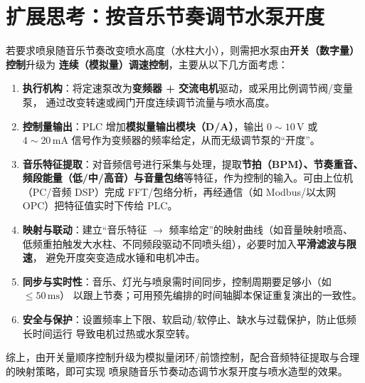 \documentclass[12pt,a4paper]{ctexart}
\begin{document}
\section{扩展思考：按音乐节奏调节水泵开度}
若要求喷泉随音乐节奏改变喷水高度（水柱大小），则需把水泵由\textbf{开关（数字量）控制}升级为
\textbf{连续（模拟量）调速控制}，主要从以下几方面考虑：
\begin{enumerate}
  \item \textbf{执行机构}：将定速泵改为\textbf{变频器 + 交流电机}驱动，或采用比例调节阀/变量泵，
        通过改变转速或阀门开度连续调节流量与喷水高度。
  \item \textbf{控制量输出}：PLC 增加\textbf{模拟量输出模块（D/A）}，输出 $0\!\sim\!10\,\mathrm{V}$ 或
        $4\!\sim\!20\,\mathrm{mA}$ 信号作为变频器的频率给定，从而无级调节泵的“开度”。
  \item \textbf{音乐特征提取}：对音频信号进行采集与处理，提取\textbf{节拍（BPM）、节奏重音、
        频段能量（低/中/高音）与音量包络}等特征，作为控制的输入。可由上位机（PC/音频 DSP）完成
        FFT/包络分析，再经通信（如 Modbus/以太网 OPC）把特征值实时下传给 PLC。
  \item \textbf{映射与联动}：建立“音乐特征 $\rightarrow$ 频率给定”的映射曲线（如音量映射喷高、
        低频重拍触发大水柱、不同频段驱动不同喷头组），必要时加入\textbf{平滑滤波与限速}，
        避免开度突变造成水锤和电机冲击。
  \item \textbf{同步与实时性}：音乐、灯光与喷泉需时间同步，控制周期要足够小（如 $\le 50\,\mathrm{ms}$）
        以跟上节奏；可用预先编排的时间轴脚本保证重复演出的一致性。
  \item \textbf{安全与保护}：设置频率上下限、软启动/软停止、缺水与过载保护，防止低频长时间运行
        导致电机过热或水泵空转。
\end{enumerate}
综上，由开关量顺序控制升级为模拟量闭环/前馈控制，配合音频特征提取与合理的映射策略，即可实现
喷泉随音乐节奏动态调节水泵开度与喷水造型的效果。
\end{document}
